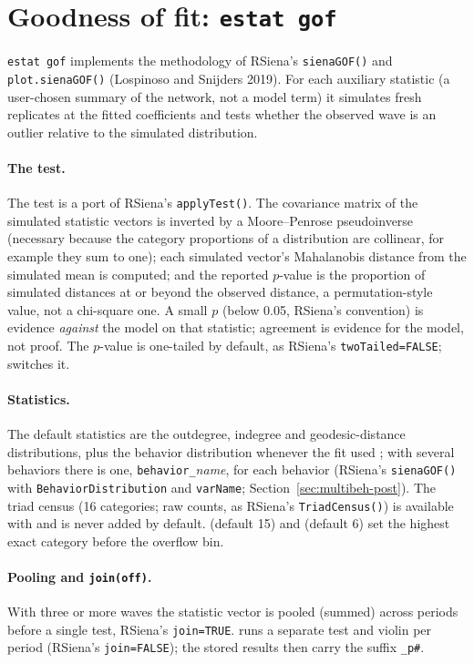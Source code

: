\section{Goodness of fit: \texttt{estat gof}}
\texttt{estat gof} implements the methodology of RSiena's \texttt{sienaGOF()} and \texttt{plot.sienaGOF()} (Lospinoso and Snijders 2019). For each auxiliary statistic (a user-chosen summary of the network, not a model term) it simulates  fresh replicates at the fitted coefficients and tests whether the observed wave is an outlier relative to the simulated distribution.

\paragraph{The test.} The test is a port of RSiena's \texttt{applyTest()}. The covariance matrix of the simulated statistic vectors is inverted by a Moore--Penrose pseudoinverse (necessary because the category proportions of a distribution are collinear, for example they sum to one); each simulated vector's Mahalanobis distance from the simulated mean is computed; and the reported $p$-value is the proportion of simulated distances at or beyond the observed distance, a permutation-style value, not a chi-square one. A small $p$ (below 0.05, RSiena's convention) is evidence \emph{against} the model on that statistic; agreement is evidence for the model, not proof. The $p$-value is one-tailed by default, as RSiena's \texttt{twoTailed=FALSE};  switches it.

\paragraph{Statistics.} The default statistics are the outdegree, indegree and geodesic-distance distributions, plus the behavior distribution whenever the fit used ; with several behaviors there is one, \texttt{behavior\_}\emph{name}, for each behavior (RSiena's \texttt{sienaGOF()} with \texttt{BehaviorDistribution} and \texttt{varName}; Section~\ref{sec:multibeh-post}). The triad census (16 categories; raw counts, as RSiena's \texttt{TriadCensus()}) is available with  and is never added by default.  (default 15) and  (default 6) set the highest exact category before the overflow bin.

\paragraph{Pooling and \texttt{join(off)}.} With three or more waves the statistic vector is pooled (summed) across periods before a single test, RSiena's \texttt{join=TRUE}.  runs a separate test and violin per period (RSiena's \texttt{join=FALSE}); the stored results then carry the suffix \texttt{\_p\#}.

